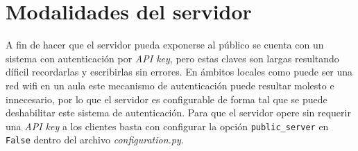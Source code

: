 \section{Modalidades del servidor}

A fin de hacer que el servidor pueda exponerse al público se cuenta con
un sistema con autenticación por \textit{API key}, pero estas claves
son largas resultando díficil recordarlas y escribirlas sin errores. En
ámbitos locales como puede ser una red wifi en un aula este mecanismo
de autenticación puede resultar molesto e innecesario, por lo que el
servidor es configurable de forma tal que se puede deshabilitar este
sistema de autenticación. Para que el servidor opere sin requerir
una \textit{API key} a los clientes basta con configurar la opción
\texttt{public\_server} en \texttt{False} dentro del archivo
\textit{configuration.py}.


